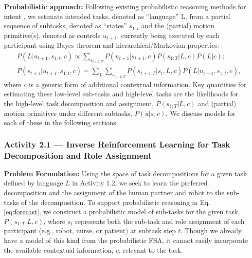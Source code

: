 \documentclass[letterpaper, 11 pt, onecolumn]{article}
\begin{document}
\noindent
{\bf Probabilistic approach:}
Following existing probabilistic reasoning methods for intent \cite{wang2013probabilistic},
we estimate intended tasks, denoted as ``language'' L, from a partial sequence of subtasks, denoted as ``states'' $s_{1:t}$ and the (partial) motion primitive(s), denoted as controls $u_{t+1}$, currently being executed by each participant using Bayes theorem and hierarchical/Markovian properties:
\begin{align}
& P(L|u_{t+1}, s_{1:t}, c) \propto \sum_{s_{t+1:T}} P(u_{t+1}|s_{t+1}, c) P(s_{1:T}|L, c) P(L|c); \label{eq:forecast}\\
& P(s_{t+1}|u_{t+1}, s_{1:t}, c) =
\sum_{L}\sum_{s_{t+2:T}} P(s_{t+1:T}|s_t,L,c) P(L|u_{t+1}, s_{1:t},c),
\end{align}
where $c$ is a generic form of additional contextual information.
Key quantities for estimating these low-level sub-tasks and high-level tasks are 
the likelihoods for the high-level task decomposition and assignment, $P(s_{1:T}|L,c)$ and
(partial) motion primitives under different subtasks, $P(u|s,c)$. We discuss models for each of these in the following sections.

\subsubsection{Activity 2.1 --- Inverse Reinforcement Learning for Task Decomposition and Role Assignment}\label{sec:plan-intent-Stackelberg}


\noindent
{\bf Problem Formulation:} Using the space of task decompositions for a given task defined by language $L$ in Activity 1.2, we seek to learn the preferred decomposition and the assignment of the human partner and robot to the sub-tasks of the decomposition. To support probabilistic reasoning in Eq. \eqref{eq:forecast}, we construct a probabilistic model of sub-tasks for the given task, $P(s_{1:T}|L,c)$, where $s_t$ represents both the sub-task and role assignment of each participant (e.g., robot, nurse, or patient) at subtask step $t$. Though we already have a model of this kind from the probabilistic FSA, it cannot easily incorporate the available contextual information, $c$, relevant to the task.
\end{document}
